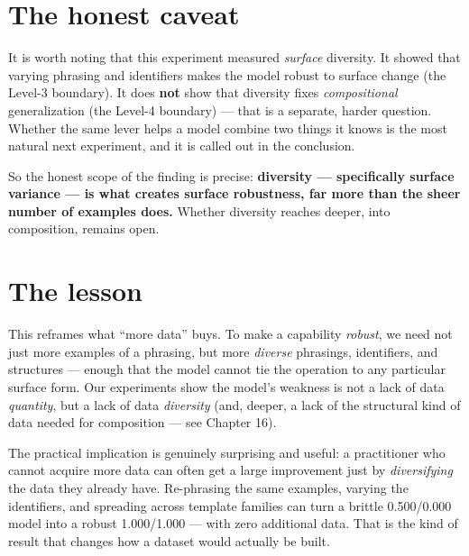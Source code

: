 \section{The honest caveat}\label{the-honest-caveat}

It is worth noting that this experiment measured \emph{surface}
diversity. It showed that varying phrasing and identifiers makes the
model robust to surface change (the Level-3 boundary). It does
\textbf{not} show that diversity fixes \emph{compositional}
generalization (the Level-4 boundary) --- that is a separate, harder
question. Whether the same lever helps a model combine two things it
knows is the most natural next experiment, and it is called out in the
conclusion.

So the honest scope of the finding is precise: \textbf{diversity ---
specifically surface variance --- is what creates surface robustness,
far more than the sheer number of examples does.} Whether diversity
reaches deeper, into composition, remains open.

\section{The lesson}\label{the-lesson}

This reframes what ``more data'' buys. To make a capability
\emph{robust}, we need not just more examples of a phrasing, but more
\emph{diverse} phrasings, identifiers, and structures --- enough that
the model cannot tie the operation to any particular surface form. Our
experiments show the model's weakness is not a lack of data
\emph{quantity}, but a lack of data \emph{diversity} (and, deeper, a
lack of the structural kind of data needed for composition --- see
Chapter 16).

The practical implication is genuinely surprising and useful: a
practitioner who cannot acquire more data can often get a large
improvement just by \emph{diversifying} the data they already have.
Re-phrasing the same examples, varying the identifiers, and spreading
across template families can turn a brittle 0.500/0.000 model into a
robust 1.000/1.000 --- with zero additional data. That is the kind of
result that changes how a dataset would actually be built.
